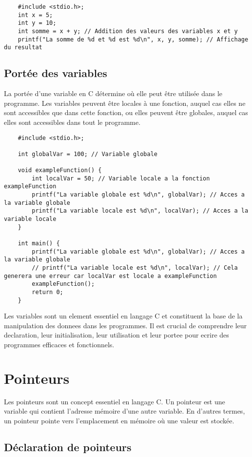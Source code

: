 \begin{lstlisting}
	#include <stdio.h>;
	int x = 5;
	int y = 10;
	int somme = x + y; // Addition des valeurs des variables x et y
	printf("La somme de %d et %d est %d\n", x, y, somme); // Affichage du resultat
\end{lstlisting}

\subsection{Portée des variables}

La portée d'une variable en C détermine où elle peut être utilisée dans le programme. Les variables peuvent être locales à une fonction, auquel cas elles ne sont accessibles que dans cette fonction, ou elles peuvent être globales, auquel cas elles sont accessibles dans tout le programme.

\begin{lstlisting}
	#include <stdio.h>;
	
	int globalVar = 100; // Variable globale
	
	void exampleFunction() {
		int localVar = 50; // Variable locale a la fonction exampleFunction
		printf("La variable globale est %d\n", globalVar); // Acces a la variable globale
		printf("La variable locale est %d\n", localVar); // Acces a la variable locale
	}
	
	int main() {
		printf("La variable globale est %d\n", globalVar); // Acces a la variable globale
		// printf("La variable locale est %d\n", localVar); // Cela generera une erreur car localVar est locale a exampleFunction
		exampleFunction();
		return 0;
	}
\end{lstlisting}

Les variables sont un element essentiel en langage C et constituent la base de la manipulation des donnees dans les programmes. Il est crucial de comprendre leur declaration, leur initialisation, leur utilisation et leur portee pour ecrire des programmes efficaces et fonctionnels.


\section{Pointeurs}

Les pointeurs sont un concept essentiel en langage C. Un pointeur est une variable qui contient l'adresse mémoire d'une autre variable. En d'autres termes, un pointeur pointe vers l'emplacement en mémoire où une valeur est stockée.

\subsection{Déclaration de pointeurs}

